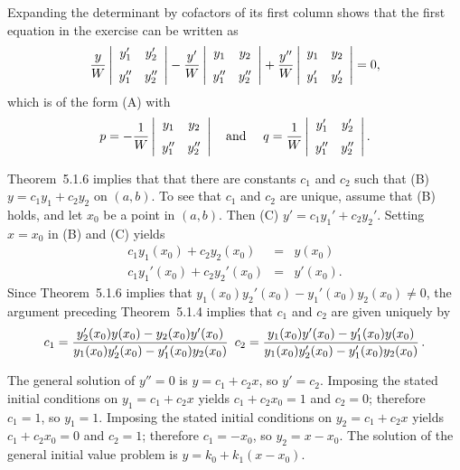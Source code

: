\documentclass[dvips]{book}
\renewcommand{\exer}[1]{\par\medskip\;\noindent{\color{red}\bf #1.}}
\numberwithin{example}{section}
\numberwithin{equation}{section}
\numberwithin{theorem}{section}
\numberwithin{table}{section}
\numberwithin{figure}{section}
\begin{document}
\exer{5.1.34}
Expanding  the determinant by cofactors of its first column shows that
the first equation in the exercise can be written as
$$
{y\over W}\left| \begin{array}{cc}
y_1' & y_2' \\[2\jot]
y_1'' & y_2''
\end{array} \right|-
{y'\over W}\left| \begin{array}{cc}
y_1 & y_2 \\[2\jot]
y_1'' & y_2''
\end{array} \right|+
{y''\over W}\left| \begin{array}{cc}
y_1 & y_2 \\[2\jot]
y'_1 & y'_2
\end{array} \right|=0,
$$
which is of the form (A) with
$$
p=-{1\over W}\left| \begin{array}{cc}
y_1 & y_2 \\[2\jot]
y_1'' & y_2''
\end{array} \right|
\mbox{\quad and \quad}
q={1\over W}\left| \begin{array}{cc}
y_1' & y_2' \\[2\jot]
y_1'' & y_2''
\end{array} \right|.
$$


\exer{5.1.36}  Theorem~5.1.6 implies that
that there are constants $c_1$ and $c_2$ such that
(B) $y=c_1y_1+c_2y_2$
on $(a,b)$. To see that $c_1$ and $c_2$ are unique, assume that (B)
holds, and let $x_0$ be a point in  $(a,b)$. Then (C)
$y'=c_1y_1'+c_2y_2'$. Setting $x=x_0$ in (B) and (C) yields
$$
\begin{array}{rcc}
c_1y_1(x_0)+c_2y_2(x_0)&=&y(x_0)\\
c_1y_1'(x_0)+c_2y_2'(x_0)&=&y'(x_0).
\end{array}
$$
Since  Theorem~5.1.6  implies that
$y_1(x_0)y_2'(x_0)-y_1'(x_0)y_2(x_0)\ne0$, the argument preceding
 Theorem~5.1.4 implies that $c_1$ and $c_2$ are given
uniquely by
$$
c_1={y_2'(x_0)y(x_0)-y_2(x_0)y'(x_0)\over
y_1(x_0)y_2'(x_0)-y_1'(x_0)y_2(x_0)}\,\
c_2={y_1(x_0)y'(x_0)-y_1'(x_0)y(x_0)\over
y_1(x_0)y_2'(x_0)-y_1'(x_0)y_2(x_0)}\,.
$$


\exer{5.1.38}
The general solution of $y''=0$ is $y=c_1+c_2x$, so $y'=c_2$. Imposing
the stated initial conditions on $y_1=c_1+c_2x$  yields $c_1+c_2x_0=1$
and $c_2=0$; therefore $c_1=1$, so $y_1=1$.
Imposing the stated initial conditions on $y_2=c_1+c_2x$  yields
$c_1+c_2x_0=0$ and $c_2=1$; therefore $c_1=-x_0$, so $y_2=x-x_0$.
The solution of the general initial value problem is
$y=k_0+k_1(x-x_0)$.
\end{document}
